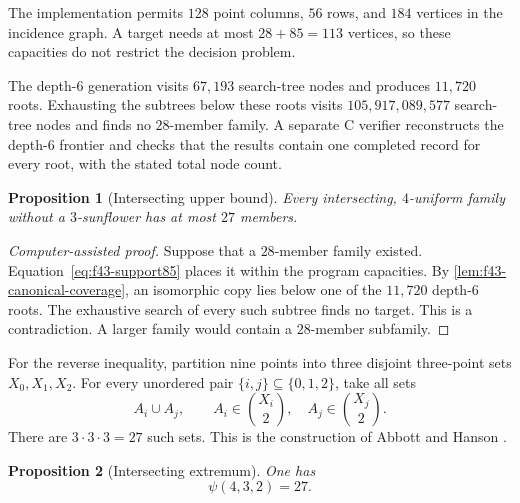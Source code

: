 \documentclass[11pt]{article}
\numberwithin{equation}{section}
\newtheorem{proposition}[proposition]{Proposition}
\theoremstyle{definition}
\theoremstyle{remark}
\begin{document}
The implementation permits $128$ point columns, $56$ rows, and $184$
vertices in the incidence graph. A target needs at most $28+85=113$
vertices, so these capacities do not restrict the decision problem.

The depth-$6$ generation visits $67{,}193$ search-tree nodes and produces
$11{,}720$ roots. Exhausting the subtrees below these roots visits
$105{,}917{,}089{,}577$ search-tree nodes and finds no $28$-member family. A
separate C verifier reconstructs the depth-$6$ frontier and checks that the
results contain one completed record for every root, with the stated total
node count.

\begin{proposition}[Intersecting upper bound]
\label{prop:f43-intersecting-upper}
Every intersecting, $4$-uniform family without a $3$-sunflower has at most
$27$ members.
\end{proposition}

\begin{proof}[Computer-assisted proof]
Suppose that a $28$-member family existed. Equation~\eqref{eq:f43-support85}
places it within the program capacities. By
\cref{lem:f43-canonical-coverage}, an isomorphic copy lies below one of the
$11{,}720$ depth-$6$ roots. The exhaustive search of every such subtree
finds no target. This is a contradiction. A larger family would contain a
$28$-member subfamily.
\end{proof}

For the reverse inequality, partition nine points into three disjoint
three-point sets $X_0,X_1,X_2$. For every unordered pair
$\{i,j\}\subseteq\{0,1,2\}$, take all sets
\begin{equation}
 A_i\cup A_j,
 \qquad
 A_i\in\binom{X_i}{2},
 \quad A_j\in\binom{X_j}{2}.
 \label{eq:f43-AHS27}
\end{equation}
There are $3\cdot3\cdot3=27$ such sets. This is the construction of Abbott
and Hanson \cite[p.~9]{AbbottHanson1974}.

\begin{proposition}[Intersecting extremum]
\label{prop:f43-intersecting-exact}
One has
\begin{equation}
 \psi(4,3,2)=27.
 \label{eq:f43-psi27}
\end{equation}
\end{proposition}
\end{document}
